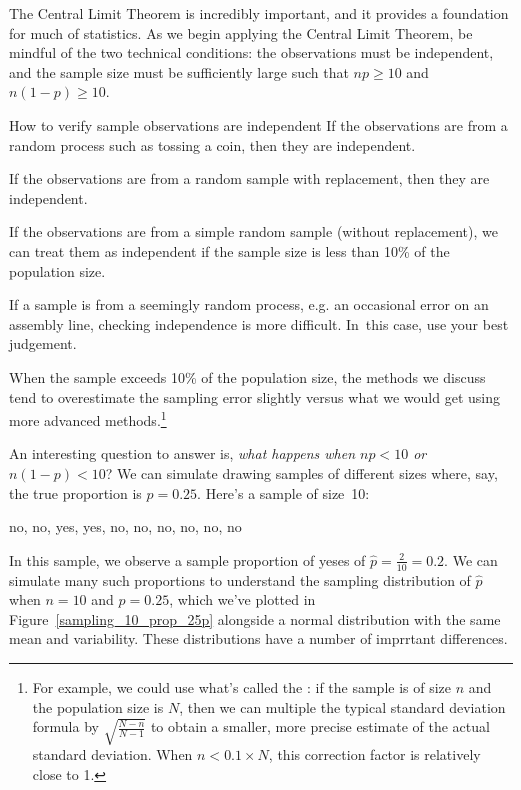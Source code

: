 The Central Limit Theorem is incredibly important, and it provides
a foundation for much of statistics.
As we begin applying
the Central Limit Theorem, be mindful of the two
technical conditions:
the observations must be independent, and the sample size must
be sufficiently large such that $np \geq 10$ and $n(1-p) \geq 10$.

\begin{onebox}{How to verify sample observations are independent}
  If the observations are from a random process such as tossing a coin, then they are independent.\stdvspace{}

  If the observations are from a random sample with replacement,
  then they are independent.\stdvspace{}

  If the observations are from a simple random sample (without replacement), we can treat them as independent if the sample size is less than 10\% of the population size.\stdvspace{}

  If a sample is from a seemingly random process,
  e.g. an occasional error on an assembly line,
  checking independence is more difficult. In~this case,
  use your best judgement.
\end{onebox}

When the sample exceeds 10\% of the population size,
the methods we discuss tend to overestimate the sampling error
slightly versus what we would get using more advanced
methods.\footnote{For example, we could use what's called the
  :
  if the sample is of size $n$ and the population size is $N$,
  then we can multiple the typical standard deviation formula by
  $\sqrt{\frac{N-n}{N-1}}$
  to obtain a smaller, more precise estimate of the
  actual standard deviation.
  When $n < 0.1 \times N$, this correction factor is relatively close to 1.}


An interesting question to answer is, \emph{what happens when
$np < 10$ or $n(1-p) < 10$}? We can simulate drawing samples of different sizes where,
say, the true proportion is $p = 0.25$.
Here's a sample of size~10:
\begin{center}
no, no, yes, yes, no, no, no, no, no, no
\end{center}
In this sample, we observe a sample proportion of yeses
of $\hat{p} = \frac{2}{10} = 0.2$. We can simulate many such
proportions to understand the sampling distribution of
$\hat{p}$ when $n = 10$ and $p = 0.25$, which we've plotted
in Figure~\ref{sampling_10_prop_25p}
alongside a normal distribution with the
same mean and variability.
These distributions have a number of imprrtant differences.

